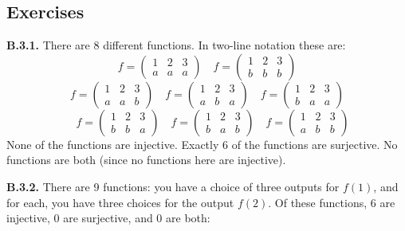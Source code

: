 \documentclass[10pt,]{book}
\theoremstyle{plain}
\theoremstyle{definition}
\theoremstyle{definition}
\theoremstyle{definition}
\theoremstyle{definition}
\numberwithin{equation}{chapter}
\newcommand{\amp}{&}
\begin{document}
\subsection*{ Exercises}
\noindent\textbf{B.3.1.} \hypertarget{p-1787}{}%
There are 8 different functions. In two-line notation these are:%
\begin{equation*}
f = \begin{pmatrix} 1 \amp 2 \amp 3 \\ a \amp a\amp a \end{pmatrix} \quad f = \begin{pmatrix} 1 \amp 2 \amp 3 \\ b \amp b \amp b \end{pmatrix}
\end{equation*}
%
\begin{equation*}
f = \begin{pmatrix} 1 \amp 2 \amp 3 \\ a \amp a\amp b \end{pmatrix} \quad f = \begin{pmatrix} 1 \amp 2 \amp 3 \\ a \amp b \amp a \end{pmatrix} \quad f = \begin{pmatrix} 1 \amp 2 \amp 3 \\ b \amp a\amp a \end{pmatrix}
\end{equation*}
%
\begin{equation*}
\quad f = \begin{pmatrix} 1 \amp 2 \amp 3 \\ b \amp b \amp a \end{pmatrix} \quad f = \begin{pmatrix} 1 \amp 2 \amp 3 \\ b \amp a\amp b \end{pmatrix} \quad f = \begin{pmatrix} 1 \amp 2 \amp 3 \\ a \amp b \amp b \end{pmatrix} 
\end{equation*}
None of the functions are injective. Exactly 6 of the functions are surjective. No functions are both (since no functions here are injective).%
\par\smallskip
\noindent\textbf{B.3.2.} \hypertarget{p-1789}{}%
There are 9 functions: you have a choice of three outputs for \(f(1)\), and for each, you have three choices for the output \(f(2)\). Of these functions, 6 are injective, 0 are surjective, and 0 are both:%
\end{document}
